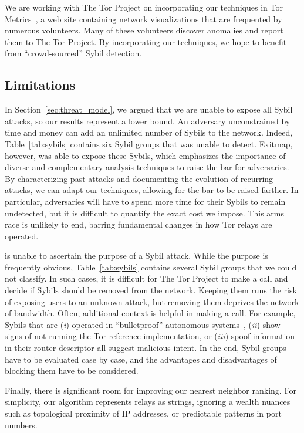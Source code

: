 We are working with The Tor Project on incorporating our techniques in Tor
Metrics~\cite{metrics}, a web site containing network visualizations that are
frequented by numerous volunteers.  Many of these volunteers discover anomalies
and report them to The Tor Project.  By incorporating our techniques, we hope
to benefit from ``crowd-sourced'' Sybil detection.

\subsection{Limitations}
\label{sec:limitations}
In Section~\ref{sec:threat_model}, we argued that we are unable to expose all
Sybil attacks, so our results represent a lower bound.  An adversary
unconstrained by time and money can add an unlimited number of Sybils to the
network.  Indeed, Table~\ref{tab:sybils} contains six Sybil groups that \sys
was unable to detect.  Exitmap, however, was able to expose these Sybils, which
emphasizes the importance of diverse and complementary analysis techniques to
raise the bar for adversaries.  By characterizing past attacks and documenting
the evolution of recurring attacks, we can adapt our techniques, allowing for
the bar to be raised farther.  In particular, adversaries will have to spend
more time for their Sybils to remain undetected, but it is difficult to
quantify the exact cost we impose.  This arms race is unlikely to end, barring
fundamental changes in how Tor relays are operated.  

\Sys is unable to ascertain the purpose of a Sybil attack.  While the purpose
is frequently obvious, Table~\ref{tab:sybils} contains several Sybil groups
that we could not classify.  In such cases, it is difficult for The Tor Project
to make a call and decide if Sybils should be removed from the network.
Keeping them runs the risk of exposing users to an unknown attack, but removing
them deprives the network of bandwidth.  Often, additional context is helpful
in making a call.  For example, Sybils that are (\emph{i}) operated in
``bulletproof'' autonomous systems~\cite{Konte2015a}, (\emph{ii}) show signs of
not running the Tor reference implementation, or (\emph{iii}) spoof information
in their router descriptor all suggest malicious intent.  In the end, Sybil
groups have to be evaluated case by case, and the advantages and disadvantages
of blocking them have to be considered.

Finally, there is significant room for improving our nearest neighbor ranking.
For simplicity, our algorithm represents relays as strings, ignoring a wealth
nuances such as topological proximity of IP addresses, or predictable patterns
in port numbers.
